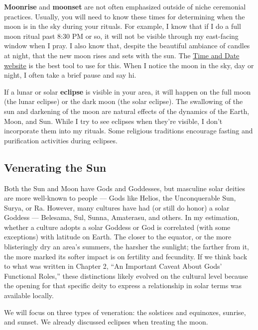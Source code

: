 \documentclass[
]{book}
\begin{document}
\textbf{Moonrise} and \textbf{moonset} are not often emphasized outside of niche ceremonial practices. Usually, you will need to know these times for determining when the moon is in the sky during your rituals. For example, I know that if I do a full moon ritual past 8:30 PM or so, it will not be visible through my east-facing window when I pray. I also know that, despite the beautiful ambiance of candles at night, that the new moon rises and sets with the sun. The \href{https://www.timeanddate.com/moon/}{Time and Date website} is the best tool to use for this. When I notice the moon in the sky, day or night, I often take a brief pause and say hi.

If a lunar or solar \textbf{eclipse} is visible in your area, it will happen on the full moon (the lunar eclipse) or the dark moon (the solar eclipse). The swallowing of the sun and darkening of the moon are natural effects of the dynamics of the Earth, Moon, and Sun. While I try to see eclipses when they're visible, I don't incorporate them into my rituals. Some religious traditions encourage fasting and purification activities during eclipses.

\hypertarget{venerating-the-sun}{%
\subsection{Venerating the Sun}\label{venerating-the-sun}}

Both the Sun and Moon have Gods and Goddesses, but masculine solar deities are more well-known to people --- Gods like Helios, the Unconquerable Sun, Surya, or Ra. However, many cultures have had (or still do honor) a solar Goddess --- Belesama, Sul, Sunna, Amaterasu, and others. In my estimation, whether a culture adopts a solar Goddess or God is correlated (with some exceptions) with latitude on Earth. The closer to the equator, or the more blisteringly dry an area's summers, the harsher the sunlight; the farther from it, the more marked its softer impact is on fertility and fecundity. If we think back to what was written in Chapter 2, ``An Important Caveat About Gods' Functional Roles,'' these distinctions likely evolved on the cultural level because the opening for that specific deity to express a relationship in solar terms was available locally.

We will focus on three types of veneration: the solstices and equinoxes, sunrise, and sunset. We already discussed eclipses when treating the moon.
\end{document}
